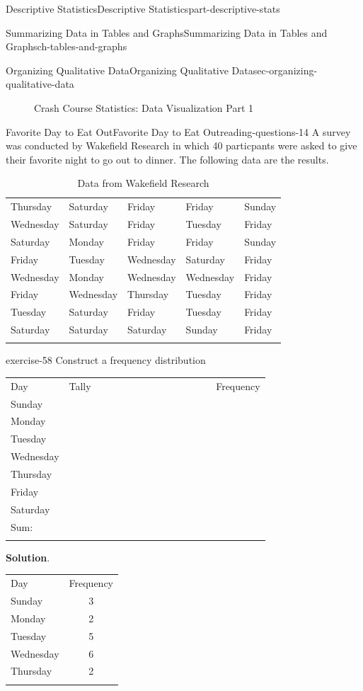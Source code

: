 \documentclass[oneside,10pt,]{book}
\numberwithin{equation}{section}
\newcommand{\hrulethin}  {\noalign{\hrule height 0.04em}}
\newcommand{\hrulethick} {\noalign{\hrule height 0.11em}}
\begin{document}
\begin{partptx}{Descriptive Statistics}{}{Descriptive Statistics}{}{}{part-descriptive-stats}
\begin{chapterptx}{Summarizing Data in Tables and Graphs}{}{Summarizing Data in Tables and Graphs}{}{}{ch-tables-and-graphs}
\begin{sectionptx}{Organizing Qualitative Data}{}{Organizing Qualitative Data}{}{}{sec-organizing-qualitative-data}
\begin{figure}
\begin{tcbraster}[raster columns=2, raster column skip=1pt, raster halign=center, raster force size=false, raster left skip=0pt, raster right skip=0pt]
\end{tcbraster}%
\caption{Crash Course Statistics: Data Visualization Part 1\label{figure-5}}
\end{figure}
%
%
\typeout{************************************************}
\typeout{************************************************}
%
\begin{reading-questions-subsection-numberless}{Favorite Day to Eat Out}{}{Favorite Day to Eat Out}{}{}{reading-questions-14}
\hypertarget{p-38}{}%
A survey was conducted by Wakefield Research in which 40 particpants were asked to give their favorite night to go out to dinner. The following data are the results.%
\begin{table}
\centering
\begin{tabular}{lllll}\hrulethick
Thursday&Saturday&Friday&Friday&Sunday\tabularnewline\hrulethin
Wednesday&Saturday&Friday&Tuesday&Friday\tabularnewline\hrulethin
Saturday&Monday&Friday&Friday&Sunday\tabularnewline\hrulethin
Friday&Tuesday&Wednesday&Saturday&Friday\tabularnewline\hrulethin
Wednesday&Monday&Wednesday&Wednesday&Friday\tabularnewline\hrulethin
Friday&Wednesday&Thursday&Tuesday&Friday\tabularnewline\hrulethin
Tuesday&Saturday&Friday&Tuesday&Friday\tabularnewline\hrulethin
Saturday&Saturday&Saturday&Sunday&Friday\tabularnewline\hrulethin
\end{tabular}
\caption{Data from Wakefield Research\label{table-2}}
\end{table}
\begin{divisionexercise}{1}{}{}{exercise-58}%
\hypertarget{p-39}{}%
Construct a frequency distribution%
\begin{tabular}{lll}\hrulethick
Day&Tally&Frequency\tabularnewline\hrulethick
Sunday& ~~~~~ ~~~~~ ~~~~~ ~~~~~ ~~~~~&\tabularnewline\hrulethin
Monday&&\tabularnewline\hrulethin
Tuesday&&\tabularnewline\hrulethin
Wednesday&&\tabularnewline\hrulethin
Thursday&&\tabularnewline\hrulethin
Friday&&\tabularnewline\hrulethin
Saturday&&\tabularnewline\hrulethick
Sum:&&\tabularnewline\hrulethick
\end{tabular}
\textbf{Solution}.\hypertarget{solution-3}{}\quad%
\begin{tabular}{ll}\hrulethick
Day&\multicolumn{1}{c}{Frequency}\tabularnewline\hrulethick
Sunday&\multicolumn{1}{c}{3}\tabularnewline\hrulethin
Monday&\multicolumn{1}{c}{2}\tabularnewline\hrulethin
Tuesday&\multicolumn{1}{c}{5}\tabularnewline\hrulethin
Wednesday&\multicolumn{1}{c}{6}\tabularnewline\hrulethin
Thursday&\multicolumn{1}{c}{2}\tabularnewline\hrulethin

\end{tabular}
\end{divisionexercise}
\end{reading-questions-subsection-numberless}
\end{sectionptx}
\end{chapterptx}
\end{partptx}
\end{document}
